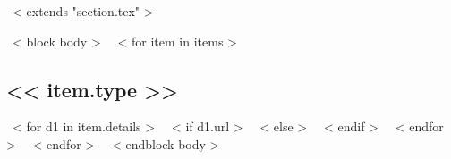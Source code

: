 \newpage
~< extends "section.tex" >~

~< block body >~
    ~< for item in items >~
	\subsection{<< item.type >>}
	~< for d1 in item.details >~
    ~< if d1.url >~
    ~< else >~
  ~< endif >~
	~< endfor >~
    ~< endfor >~
~< endblock body >~



